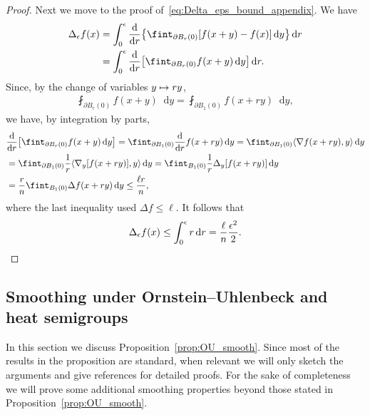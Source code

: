 \documentclass[10pt]{amsart}
\theoremstyle{definition}\newtheorem{defi}[theo]{Definition}\newtheorem{rema}[theo]{Remark}\newtheorem{exam}[theo]{Example}\newtheorem{exem}[theo]{Example}\newtheorem{nota}[theo]{Notation}
\newcommand{\dd}{n}
\newcommand*\diff{\mathop{}\!\mathrm{d}}
\newcommand{\avgint}{\fint}
\let\oldmapsto\mapsto
\renewcommand*{\mapsto}{\mathchoice{\longmapsto}{\oldmapsto}{\oldmapsto}{\oldmapsto}}
\let\originalleft\left
\let\originalright\right
\renewcommand{\left}{\mathopen{}\mathclose\bgroup\originalleft}
\renewcommand{\right}{\aftergroup\egroup\originalright}
\begin{document}
\begin{proof}
Next we move to the proof of~\eqref{eq:Delta_eps_bound_appendix}. We have
\begin{align*}
\Delta_{\epsilon}f(x)&=\int_0^{\epsilon} \frac{\diff}{\diff r}\left\{\avgint_{\partial B_{r}(0)}[f(x+y)-f(x)]\diff y\right\}\diff r\\
&=\int_0^{\epsilon} \frac{\diff}{\diff r}\left[\avgint_{\partial B_{r}(0)}f(x+y)\diff y\right]\diff r.
\end{align*}
Since, by the change of variables $y\mapsto r y$,
\begin{align*}
\avgint_{\partial B_{r}(0)}f(x+y)\diff y=\avgint_{\partial B_1(0)}f(x+ry)\diff y,
\end{align*}
we have, by integration by parts,
\begin{align*}
&\frac{\diff}{\diff r}\left[\avgint_{\partial B_{r}(0)}f(x+y)\diff y\right]=\avgint_{\partial B_1(0)}\frac{\diff}{\diff r}f(x+ry)\diff y=\avgint_{\partial B_1(0)}\langle\nabla f(x+ry),y\rangle\diff y\\
&=\avgint_{\partial B_1(0)}\frac{1}{r}\langle\nabla_y [f(x+ry)],y\rangle\diff y=\avgint_{ B_1(0)}\frac{1}{r}\Delta_y[f(x+ry)]\diff y\\
&=\frac{r}{\dd}\avgint_{B_1(0)}\Delta f(x+ry)\diff y\le \frac{\ell r}{\dd},
\end{align*}
where the last inequality used $\Delta f\le \ell$. It follows that
\[
\Delta_{\epsilon}f(x)\le \int_0^{\epsilon}r\diff r=\frac{\ell}{\dd}\frac{\epsilon^2}{2}.\qedhere
\]
\end{proof}

\subsection{Smoothing under Ornstein--Uhlenbeck and heat semigroups}\label{subsec:appendix_smooth}
In this section we discuss Proposition~\ref{prop:OU_smooth}. Since most of the results in the proposition are standard, when relevant we will only sketch the arguments and give references for detailed proofs. For the sake of completeness we will prove some additional smoothing properties beyond those stated in Proposition~\ref{prop:OU_smooth}.
\end{document}

